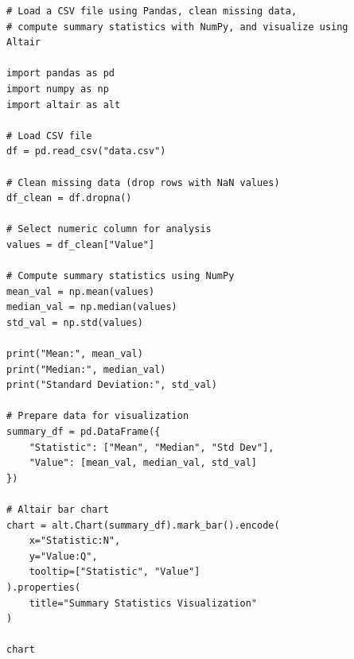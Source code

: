 \begin{verbatim}
# Load a CSV file using Pandas, clean missing data,
# compute summary statistics with NumPy, and visualize using 
Altair

import pandas as pd
import numpy as np
import altair as alt

# Load CSV file
df = pd.read_csv("data.csv")

# Clean missing data (drop rows with NaN values)
df_clean = df.dropna()

# Select numeric column for analysis
values = df_clean["Value"]

# Compute summary statistics using NumPy
mean_val = np.mean(values)
median_val = np.median(values)
std_val = np.std(values)

print("Mean:", mean_val)
print("Median:", median_val)
print("Standard Deviation:", std_val)

# Prepare data for visualization
summary_df = pd.DataFrame({
    "Statistic": ["Mean", "Median", "Std Dev"],
    "Value": [mean_val, median_val, std_val]
})

# Altair bar chart
chart = alt.Chart(summary_df).mark_bar().encode(
    x="Statistic:N",
    y="Value:Q",
    tooltip=["Statistic", "Value"]
).properties(
    title="Summary Statistics Visualization"
)

chart
\end{verbatim}